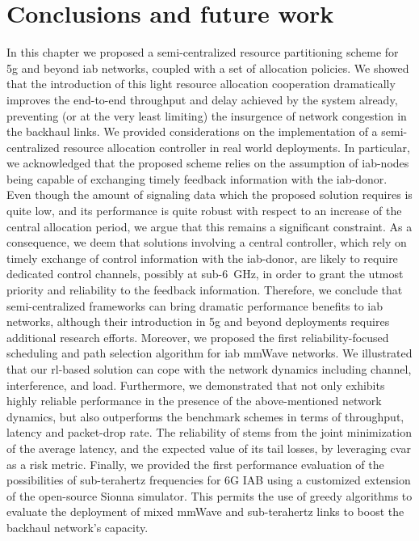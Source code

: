\section{Conclusions and future work}
\label{sec:concl-iab}


In this chapter we proposed a semi-centralized resource partitioning scheme for \gls{5g} and beyond \gls{iab} networks, coupled with a set of allocation policies. We showed that the introduction of this light resource allocation cooperation dramatically improves the end-to-end throughput and delay achieved by the system already, preventing (or at the very least limiting) the insurgence of network congestion in the backhaul links.
We provided considerations on the implementation of a semi-centralized resource allocation controller in real world deployments. In particular, we acknowledged that the proposed scheme relies on the assumption of \gls{iab}-nodes being capable of exchanging timely feedback information with the \gls{iab}-donor. Even though the amount of signaling data which the proposed solution requires is quite low, and its performance is quite robust with respect to an increase of the central allocation period, we argue that this remains a significant constraint. 
As a consequence, we deem that solutions involving a central controller, which rely on timely exchange of control information with the \gls{iab}-donor, are likely to require dedicated control channels, possibly at sub-6~{GHz}, in order to grant the utmost priority and reliability to the feedback information. 
Therefore, we conclude that semi-centralized frameworks can bring dramatic performance benefits to \gls{iab} networks, although their introduction in \gls{5g} and beyond deployments requires additional research efforts.
Moreover, we proposed the first reliability-focused scheduling and path selection algorithm for \gls{iab} mmWave networks. We illustrated that our \gls{rl}-based solution can cope with the network dynamics including channel, interference, and load. Furthermore, we demonstrated that \name{} not only  exhibits highly reliable performance in the presence of the above-mentioned network dynamics, but also outperforms the benchmark schemes in terms of throughput, latency and packet-drop rate. The reliability of \name{} stems from the joint minimization of the average latency, and the expected value of its tail losses, by leveraging \gls{cvar} as a risk metric.
Finally, we provided the first performance evaluation of the possibilities of sub-terahertz frequencies for 6G IAB using a customized extension of the open-source Sionna simulator. This permits the use of greedy algorithms to evaluate the deployment of mixed mmWave and sub-terahertz links to boost the backhaul network's capacity.


